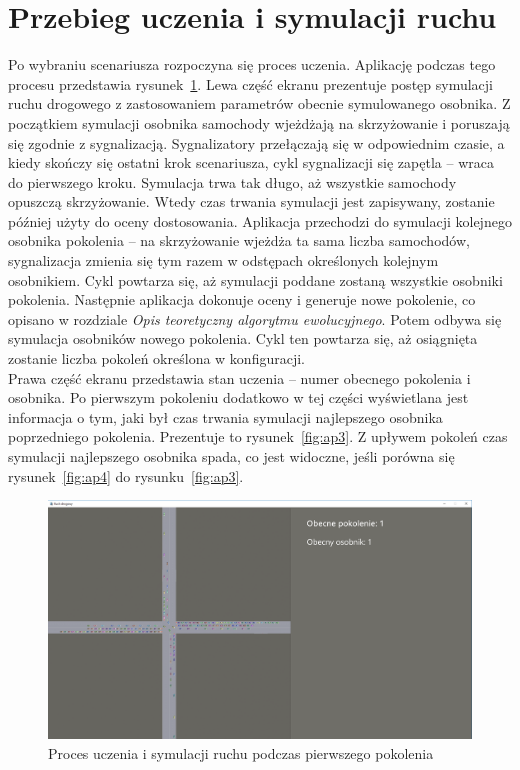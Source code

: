\section*{Przebieg uczenia i symulacji ruchu}
Po wybraniu scenariusza rozpoczyna się proces uczenia. Aplikację podczas tego procesu przedstawia rysunek~\ref{fig:ap2}. Lewa część ekranu prezentuje postęp symulacji ruchu drogowego z zastosowaniem parametrów obecnie symulowanego osobnika. Z początkiem symulacji osobnika samochody wjeżdżają na skrzyżowanie i poruszają się zgodnie z sygnalizacją. Sygnalizatory przełączają się w odpowiednim czasie, a kiedy skończy się ostatni krok scenariusza, cykl sygnalizacji się zapętla -- wraca do pierwszego kroku. Symulacja trwa tak długo, aż wszystkie samochody opuszczą skrzyżowanie. Wtedy czas trwania symulacji jest zapisywany, zostanie później użyty do oceny dostosowania. Aplikacja przechodzi do symulacji kolejnego osobnika pokolenia -- na skrzyżowanie wjeżdża ta sama liczba samochodów, sygnalizacja zmienia się tym razem w odstępach określonych kolejnym osobnikiem. Cykl powtarza się, aż symulacji poddane zostaną wszystkie osobniki pokolenia. Następnie aplikacja dokonuje oceny i generuje nowe pokolenie, co opisano w rozdziale \textit{Opis teoretyczny algorytmu ewolucyjnego}. Potem odbywa się symulacja osobników nowego pokolenia. Cykl ten powtarza się, aż osiągnięta zostanie liczba pokoleń określona w konfiguracji. \\
Prawa część ekranu przedstawia stan uczenia -- numer obecnego pokolenia i osobnika. Po pierwszym pokoleniu dodatkowo w tej części wyświetlana jest informacja o tym, jaki był czas trwania symulacji najlepszego osobnika poprzedniego pokolenia. Prezentuje to rysunek~\ref{fig:ap3}. Z upływem pokoleń czas symulacji najlepszego osobnika spada, co jest widoczne, jeśli porówna się rysunek~\ref{fig:ap4} do rysunku~\ref{fig:ap3}.
\begin{figure}[h]
	\centering
	\includegraphics[width=1\linewidth]{ap2}
	\caption[Proces uczenia i symulacji ruchu]{Proces uczenia i symulacji ruchu podczas pierwszego pokolenia}
	\label{fig:ap2}
\end{figure}
